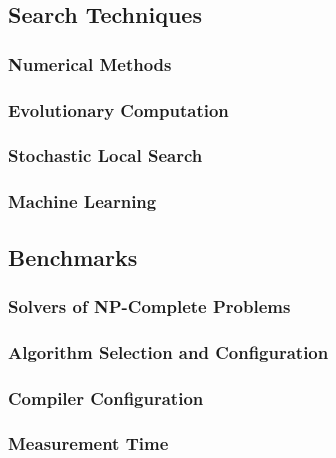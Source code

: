 \subsection{Search Techniques}
\label{sec:techniques}

\subsubsection{Numerical Methods}
\label{subsec:num}

\subsubsection{Evolutionary Computation}
\label{subsec:tuninevolcomp}

\subsubsection{Stochastic Local Search}
\label{subsec:tuningsls}

\subsubsection{Machine Learning}
\label{subsec:tuningml}

\subsection{Benchmarks}
\label{sec:benchmarks}

\subsubsection{Solvers of NP-Complete Problems}
\label{subsec:np}

\subsubsection{Algorithm Selection and Configuration}
\label{subsec:algsel}

\subsubsection{Compiler Configuration}
\label{subsec:compilerconfig}

\subsubsection{Measurement Time}
\label{subsec:measure}
